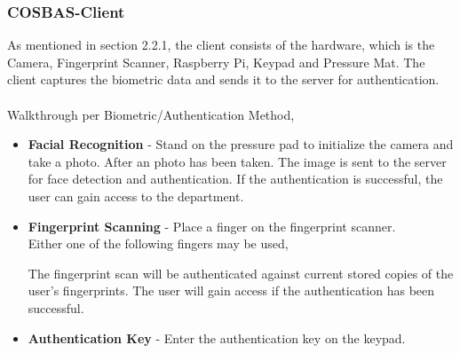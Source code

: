 \subsubsection{COSBAS-Client}
As mentioned in section 2.2.1, the client consists of the hardware, which is the Camera, Fingerprint Scanner, Raspberry Pi, Keypad and Pressure Mat. The client captures the biometric data and sends it to the server for authentication.\\
\\
Walkthrough per Biometric/Authentication Method,
\begin{itemize}
		\item{\textbf{Facial Recognition } - Stand on the pressure pad to initialize the camera and take a photo. After an photo has been taken. The image is sent to the server for face detection and authentication. If the authentication is successful, the user can gain access to the department.} 
		\item{\textbf{Fingerprint Scanning} - Place a finger on the fingerprint scanner. \\
			Either one of the following fingers may be used, 

			The fingerprint scan will be authenticated against current stored copies of the user's fingerprints. The user will gain access if the authentication has been successful.
			}

	\item{\textbf{Authentication Key} - Enter the authentication key on the keypad. 


		}
	\end{itemize}

